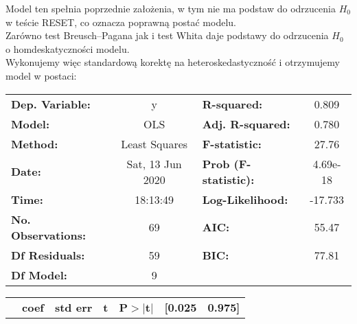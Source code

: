 \documentclass[11pt,a4paper]{article}
\begin{document}
			Model ten spełnia poprzednie założenia, w tym nie ma podstaw do odrzucenia $H_0$ w teście RESET, co oznacza poprawną postać modelu. \\
			
			Zarówno test Breusch–Pagana jak i test Whita daje podstawy do odrzucenia $H_0$ o homdeskatyczności modelu.\\
			
			Wykonujemy więc standardową korektę na heteroskedastyczność i otrzymujemy model w postaci: 
			\begin{center}
				\begin{tabular}{lclc}
					 
					\textbf{Dep. Variable:}           &        y         & \textbf{  R-squared:         } &     0.809   \\
					\textbf{Model:}                   &       OLS        & \textbf{  Adj. R-squared:    } &     0.780   \\
					\textbf{Method:}                  &  Least Squares   & \textbf{  F-statistic:       } &     27.76   \\
					\textbf{Date:}                    & Sat, 13 Jun 2020 & \textbf{  Prob (F-statistic):} &  4.69e-18   \\
					\textbf{Time:}                    &     18:13:49     & \textbf{  Log-Likelihood:    } &   -17.733   \\
					\textbf{No. Observations:}        &          69      & \textbf{  AIC:               } &     55.47   \\
					\textbf{Df Residuals:}            &          59      & \textbf{  BIC:               } &     77.81   \\
					\textbf{Df Model:}                &           9      & \textbf{                     } &             \\
					 
				\end{tabular}
				\begin{tabular}{lcccccc}
					& \textbf{coef} & \textbf{std err} & \textbf{t} & \textbf{P$> |$t$|$} & \textbf{[0.025} & \textbf{0.975]}  \\
					 

\end{tabular}
\end{center}
\end{document}
